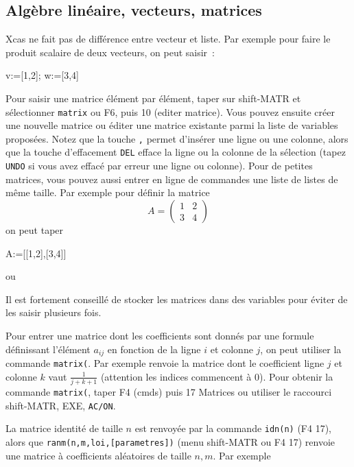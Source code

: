 \documentclass{article}
\begin{document}
\begin{giacjshere}
\subsection{Alg\`ebre lin\'eaire, vecteurs, matrices}
Xcas ne fait pas de diff\'erence entre vecteur et liste. Par
exemple pour faire le produit scalaire de deux vecteurs, on peut
saisir~:
\begin{giaconload}v:=[1,2]; w:=[3,4]\end{giaconload}

Pour saisir une matrice \'el\'ement par \'el\'ement, taper
sur shift-MATR et s\'electionner \verb|matrix| 
ou F6, puis 10 (editer matrice). Vous pouvez ensuite
cr\'eer une nouvelle matrice ou \'editer
une matrice existante parmi la liste de variables propos\'ees. 
Notez que la touche \verb|,| permet d'ins\'erer une ligne ou une colonne,
alors que la touche d'effacement \verb|DEL| efface la ligne ou la colonne de la
s\'election (tapez \verb|UNDO| si vous avez effac\'e par erreur
une ligne ou colonne).
Pour de petites matrices, vous pouvez aussi
entrer en ligne de commandes
une liste de listes de m\^eme taille. Par exemple
pour d\'efinir la matrice
$$ A=\left(\begin{array}{cc} 1 & 2 \\ 3 & 4 \end{array}\right)$$
on peut taper \begin{giaconload}A:=[[1,2],[3,4]]\end{giaconload} 
ou 

Il est fortement conseill\'e de stocker les matrices dans des variables
pour \'eviter de les saisir plusieurs fois.

Pour entrer une matrice dont les coefficients sont
donn\'es par une formule d\'efinissant l'\'el\'ement $a_{ij}$
en fonction de la ligne $i$ et colonne $j$,
on peut utiliser la commande \verb|matrix(|.
Par exemple 
renvoie
la matrice dont le coefficient ligne $j$ et colonne $k$ vaut
$\frac{1}{j+k+1}$ (attention les indices commencent \`a 0). 
Pour obtenir la commande \verb|matrix(|, taper F4 (cmds) puis
17 Matrices ou utiliser le raccourci shift-MATR, EXE, \verb|AC/ON|.

La matrice identit\'e de taille $n$ 
est renvoy\'ee par la commande \verb|idn(n)| (F4 17),
alors que \verb|ranm(n,m,loi,[parametres])| (menu shift-MATR ou F4 17)
renvoie une matrice \`a coefficients al\'eatoires de taille $n,m$.
Par exemple 


\end{giacjshere}
\end{document}
